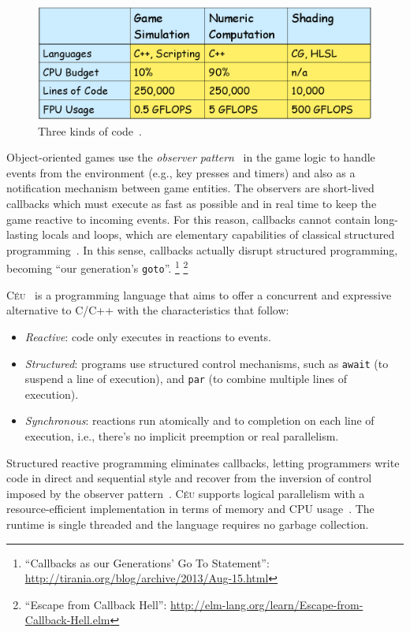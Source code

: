 \documentclass{vgtc}                          %
\newcommand{\CEU}{\textsc{C\'{e}u}\xspace}
\newcommand{\code}[1] {{\small{\texttt{#1}}}}
\begin{document}
\begin{figure}
\centering
\includegraphics[width=\columnwidth]{sweeney}
\caption{Three kinds of code~\cite{games.sweeney}.
\label{fig.sweeney}
}
\end{figure}

Object-oriented games use the \emph{observer pattern}~\cite{games.patterns}
in the game logic to handle events from the environment (e.g., key presses and
timers) and also as a notification mechanism between game entities.
%
The observers are short-lived callbacks which must execute as fast as possible
and in real time to keep the game reactive to incoming events.
%
For this reason, callbacks cannot contain long-lasting locals and loops, which
are elementary capabilities of classical structured
programming~\cite{rp.deprecating,rp.rescala,sync_async.cooperative}.
%
In this sense, callbacks actually disrupt structured programming, becoming
``our generation's \code{goto}''.%
\footnote{``Callbacks as our Generations' Go To Statement'':
\url{http://tirania.org/blog/archive/2013/Aug-15.html}}%
\footnote{``Escape from Callback Hell'':
\url{http://elm-lang.org/learn/Escape-from-Callback-Hell.elm}}

\CEU~\cite{ceu.sensys13,ceu.mod15} is a programming language that aims to offer
a concurrent and expressive alternative to C/C++ with the characteristics that
follow:
%
\begin{itemize}
\item \emph{Reactive}: code only executes in reactions to events.
\item \emph{Structured}: programs use structured control mechanisms, such as
      \code{await} (to suspend a line of execution), and \code{par} (to combine
      multiple lines of execution).
\item \emph{Synchronous}: reactions run atomically and to completion on each
      line of execution, i.e., there's no implicit preemption or real
      parallelism.
\end{itemize}
%
Structured reactive programming eliminates callbacks, letting programmers write
code in direct and sequential style and recover from the inversion of control
imposed by the observer pattern~\cite{rp.deprecating}.
%
\CEU supports logical parallelism with a resource-efficient implementation in
terms of memory and CPU usage~\cite{ceu.sensys13}.
The runtime is single threaded and the language requires no garbage
collection.
\end{document}
